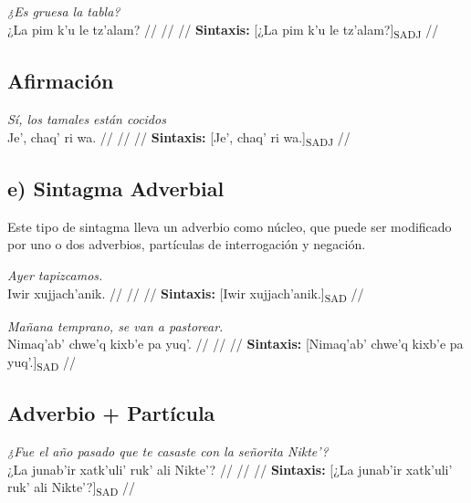 \documentclass{article}%
\begin{document}
%
\par\medskip%
\ex
\textit{¿Es gruesa la tabla?} \\
\begingl
\gla ¿La pim k'u le tz'alam? //
\glb  //
\glc  //
\glft \textbf{Sintaxis:} [¿La pim k'u le tz'alam?]\textsubscript{SADJ} //
\endgl
\xe
%
\medskip%
\subsection{Afirmación}%
\label{subsec:Afirmacin}%

%
\par\medskip%
\ex
\textit{Sí, los tamales están cocidos} \\
\begingl
\gla Je', chaq' ri wa. //
\glb  //
\glc  //
\glft \textbf{Sintaxis:} [Je', chaq' ri wa.]\textsubscript{SADJ} //
\endgl
\xe
%
\medskip%
\subsection{e) Sintagma Adverbial}%
\label{subsec:e)SintagmaAdverbial}%

%
Este tipo de sintagma lleva un adverbio como núcleo, que puede ser modificado por uno %
o dos adverbios, partículas de interrogación y negación. %
\par\medskip%
\ex
\textit{Ayer tapizcamos.} \\
\begingl
\gla Iwir xujjach'anik. //
\glb  //
\glc  //
\glft \textbf{Sintaxis:} [Iwir xujjach'anik.]\textsubscript{SAD} //
\endgl
\xe
%
\medskip%
\par\medskip%
\ex
\textit{Mañana temprano, se van a pastorear.} \\
\begingl
\gla Nimaq'ab' chwe'q kixb'e pa yuq'. //
\glb  //
\glc  //
\glft \textbf{Sintaxis:} [Nimaq'ab' chwe'q kixb'e pa yuq'.]\textsubscript{SAD} //
\endgl
\xe
%
\medskip%
\subsection{Adverbio + Partícula}%
\label{subsec:Adverbio+Partcula}%

%
\par\medskip%
\ex
\textit{¿Fue el año pasado que te casaste con la señorita Nikte'?} \\
\begingl
\gla ¿La junab'ir xatk'uli' ruk' ali Nikte'? //
\glb  //
\glc  //
\glft \textbf{Sintaxis:} [¿La junab'ir xatk'uli' ruk' ali Nikte'?]\textsubscript{SAD} //
\endgl
\xe
%
\medskip

%
\end{document}
